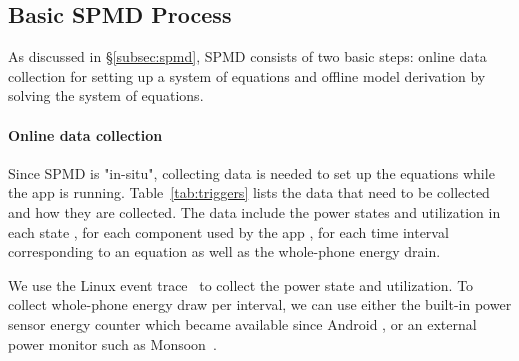 
\subsection{Basic SPMD Process}
\label{subsec:generic}

As discussed in \S\ref{subsec:spmd}, SPMD consists of two basic steps: 
online data collection for setting up a system of equations and 
offline model derivation by solving the system of equations.

\paragraph{Online data collection}
Since SPMD is "in-situ", collecting data  is needed to set up the equations  while the app is running. 
%
Table~\ref{tab:triggers} lists the data that need to be collected and how they are collected. 
The data include the power states and utilization in each state , for each component used by the app  , for each time interval corresponding to an equation as well as  the whole-phone energy drain.

We use the Linux event trace~\cite{eventtrace} to collect the power state and utilization. 
To collect whole-phone energy draw per interval, we can use either the built-in power sensor energy counter which became available since Android , or an external power monitor such as Monsoon~\cite{monsoonpowermonitor}.


